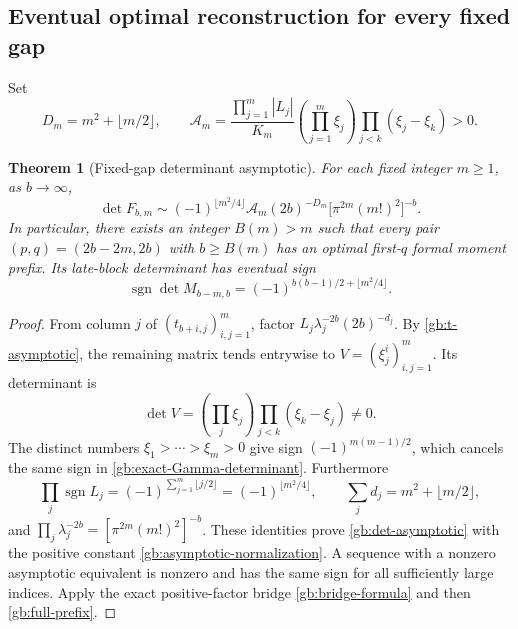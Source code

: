 \documentclass[11pt,a4paper]{article}
\numberwithin{equation}{section}
\newtheorem{theorem}{Theorem}[section]
\theoremstyle{definition}
\theoremstyle{remark}
\begin{document}
\subsection{Eventual optimal reconstruction for every fixed gap}

Set
\begin{equation}\label{gb:asymptotic-normalization}
 D_m=m^2+\lfloor m/2\rfloor,\qquad
 \mathcal A_m=
 \frac{\prod_{j=1}^m|L_j|}{K_m}
       \left(\prod_{j=1}^m\xi_j\right)
       \prod_{j<k}(\xi_j-\xi_k)>0.
\end{equation}

\begin{theorem}[Fixed-gap determinant asymptotic]\label{gb:eventual}
For each fixed integer $m\ge1$, as $b\to\infty$,
\begin{equation}\label{gb:det-asymptotic}
 \boxed{\displaystyle
 \det F_{b,m}\sim
 (-1)^{\lfloor m^2/4\rfloor}\mathcal A_m
 (2b)^{-D_m}\bigl[\pi^{2m}(m!)^2\bigr]^{-b}.}
\end{equation}
In particular, there exists an integer $B(m)>m$ such that every
pair $(p,q)=(2b-2m,2b)$ with $b\ge B(m)$ has an optimal first-$q$
formal moment prefix.  Its late-block determinant has eventual sign
\begin{equation}\label{gb:eventual-sign}
 \operatorname{sgn}\det M_{b-m,b}
        =(-1)^{b(b-1)/2+\lfloor m^2/4\rfloor}.
\end{equation}
\end{theorem}

\begin{proof}
From column $j$ of $(t_{b+i,j})_{i,j=1}^m$, factor
$L_j\lambda_j^{-2b}(2b)^{-d_j}$.  By
\eqref{gb:t-asymptotic}, the remaining matrix tends entrywise to
$V=(\xi_j^i)_{i,j=1}^m$.  Its determinant is
\[
 \det V=\left(\prod_j\xi_j\right)
                   \prod_{j<k}(\xi_k-\xi_j)\ne0.
\]
The distinct numbers $\xi_1>\cdots>\xi_m>0$ give sign
$(-1)^{m(m-1)/2}$, which cancels the same sign in
\eqref{gb:exact-Gamma-determinant}.  Furthermore
\[
 \prod_j\operatorname{sgn}L_j
    =(-1)^{\sum_{j=1}^m\lfloor j/2\rfloor}
    =(-1)^{\lfloor m^2/4\rfloor},\qquad
 \sum_jd_j=m^2+\lfloor m/2\rfloor,
\]
and
$\prod_j\lambda_j^{-2b}=[\pi^{2m}(m!)^2]^{-b}$.
These identities prove \eqref{gb:det-asymptotic} with the positive
constant \eqref{gb:asymptotic-normalization}.  A sequence with a
nonzero asymptotic equivalent is nonzero and has the same sign
for all sufficiently large indices.  Apply the exact positive-factor
bridge \eqref{gb:bridge-formula} and then \eqref{gb:full-prefix}.
\end{proof}
\end{document}
